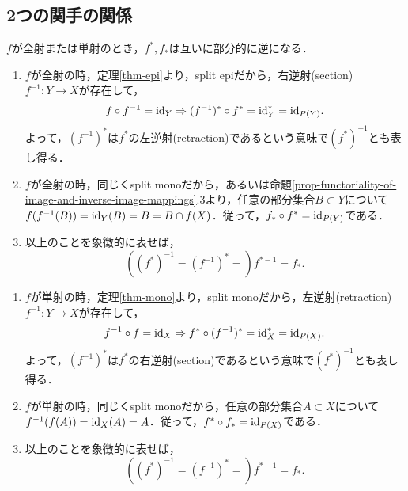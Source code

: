 \documentclass[uplatex,dvipdfmx]{jsreport}
\begin{document}
\subsection{2つの関手の関係}

\begin{tcolorbox}[colframe=ForestGreen, colback=ForestGreen!10!white,breakable,colbacktitle=ForestGreen!40!white,coltitle=black,fonttitle=\bfseries\sffamily,
title=]
    $f$が全射または単射のとき，$f^*,f_*$は互いに部分的に逆になる．
\end{tcolorbox}

\begin{proposition}[全射の双対写像]\label{prop-dual-of-epi}\mbox{}
    \begin{enumerate}
        \item $f$が全射の時，定理\ref{thm-epi}より，split epiだから，右逆射(section) $f^{-1}:Y\to X$が存在して，\[f\circ f^{-1}=\mathrm{id}_Y\Rightarrow (f^{-1})^*\circ f^*=\mathrm{id}^*_Y=\mathrm{id}_{P(Y)}.\]よって，$(f^{-1})^*$は$f^*$の左逆射(retraction)であるという意味で$(f^*)^{-1}$とも表し得る．
        \item $f$が全射の時，同じくsplit monoだから，あるいは命題\ref{prop-functoriality-of-image-and-inverse-image-mappings}.3より，任意の部分集合$B\subset Y$について$f(f^{-1}(B))=\mathrm{id}_Y(B)=B=B\cap f(X)$．従って，$f_*\circ f^*=\mathrm{id}_{P(Y)}$である．
        \item 以上のことを象徴的に表せば，\[((f^*)^{-1}=(f^{-1})^*=)f^{*-1}=f_*.\]
    \end{enumerate}
\end{proposition}

\begin{proposition}[単射の双対写像]\label{prop-dual-of-mono}\mbox{}
    \begin{enumerate}
        \item $f$が単射の時，定理\ref{thm-mono}より，split monoだから，左逆射(retraction) $f^{-1}:Y\to X$が存在して，\[f^{-1}\circ f=\mathrm{id}_X\Rightarrow f^*\circ (f^{-1})^*=\mathrm{id}^*_X=\mathrm{id}_{P(X)}.\]よって，$(f^{-1})^*$は$f^*$の右逆射(section)であるという意味で$(f^*)^{-1}$とも表し得る．
        \item $f$が単射の時，同じくsplit monoだから，任意の部分集合$A\subset X$について$f^{-1}(f(A))=\mathrm{id}_X(A)=A$．従って，$f^*\circ f_*=\mathrm{id}_{P(X)}$である．
        \item 以上のことを象徴的に表せば，\[((f^*)^{-1}=(f^{-1})^*=)f^{*-1}=f_*.\]
    \end{enumerate}
\end{proposition}
\end{document}
